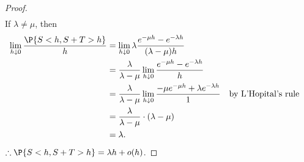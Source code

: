 \documentclass[
  coursecode={MTHE 455},
  assignmentname={Assignment \assignmentnumber},
  studentnumber=20053722,
  name={Bryan Hoang},
  draft,
]{
  ltxanswer%
}
\begin{document}
\begin{questions}
\begin{parts}
\begin{solution}
\begin{proof}
\begin{align*}
          \end{align*}
          If \(\lambda \ne \mu\), then
          \begin{align*}
            \lim_{h \downarrow 0} \frac{\P{S < h, S + T > h}}{h} &= \lim_{h \downarrow 0} \lambda \frac{e^{-\mu h} - e^{-\lambda h}}{(\lambda - \mu)h}                                                   \\
                                                                 &= \frac{\lambda}{\lambda - \mu} \lim_{h \downarrow 0} \frac{e^{-\mu h} - e^{-\lambda h}}{h}                                            \\
                                                                 &= \frac{\lambda}{\lambda - \mu} \lim_{h \downarrow 0} \frac{-\mu e^{-\mu h} + \lambda e^{-\lambda h}}{1} & &\text{by L'Hopital's rule} \\
                                                                 &= \frac{\lambda}{\lambda - \mu} \cdot (\lambda - \mu)                                                                                  \\
                                                                 &= \lambda.
          \end{align*}
          \(\therefore \P{S < h, S + T > h} = \lambda h + o(h)\).
        \end{proof}
      \end{solution}

      \newpage

\end{parts}
\end{questions}
\end{document}
